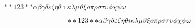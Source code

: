 \documentclass{article}%
\begin{document}
%
\normalsize%
%
 $**123**\alpha{}\beta{}\gamma{}\delta{}\varepsilon{}\zeta{}\eta{}\theta{}\imath{}\kappa{}\lambda{}\mu{}\vartheta{}\xi{}o{}\pi{}\rho{}\sigma{}\tau{}\upsilon{}\phi{}\chi{}\psi{}\omega{}$ 

%
\[%
 **123** \alpha{}\beta{}\gamma{}\delta{}\varepsilon{}\zeta{}\eta{}\theta{}\imath{}\kappa{}\lambda{}\mu{}\vartheta{}\xi{}o{}\pi{}\rho{}\sigma{}\tau{}\upsilon{}\phi{}\chi{}\psi{}\omega{}\\%
\]%
\end{document}
